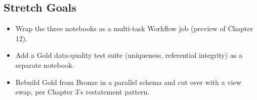 \subsection*{Stretch Goals}
\begin{itemize}
    \item Wrap the three notebooks as a multi-task Workflow job (preview of Chapter 12).
    \item Add a Gold data-quality test suite (uniqueness, referential integrity) as a separate notebook.
    \item Rebuild Gold from Bronze in a parallel schema and cut over with a view swap, per Chapter 3's restatement pattern.
\end{itemize}
